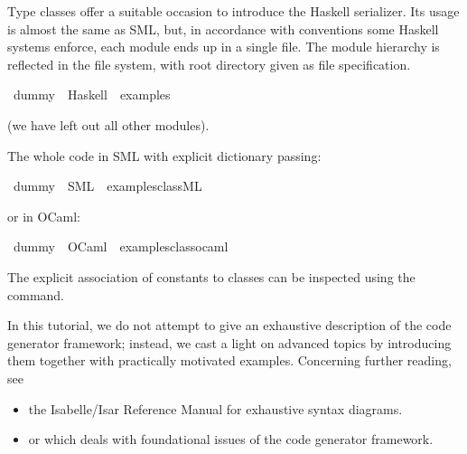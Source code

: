 \begin{isabellebody}
\begin{isamarkuptext}
Type classes offer a suitable occasion to introduce
  the Haskell serializer.  Its usage is almost the same
  as SML, but, in accordance with conventions
  some Haskell systems enforce, each module ends
  up in a single file. The module hierarchy is reflected in
  the file system, with root directory given as file specification.%
\end{isamarkuptext}%
\isamarkuptrue%
\isamarkupfalse%
\ dummy\ \ Haskell\ \ {\isachardoublequoteopen}examples{\isacharslash}{\isachardoublequoteclose}%
\begin{isamarkuptext}%
  \noindent (we have left out all other modules).

  \medskip

  The whole code in SML with explicit dictionary passing:%
\end{isamarkuptext}%
\isamarkuptrue%
\isamarkupfalse%
\ dummy\ \ SML\ \ {\isachardoublequoteopen}examples{\isacharslash}class{\isachardot}ML{\isachardoublequoteclose}%
\begin{isamarkuptext}%

  \medskip

  \noindent or in OCaml:%
\end{isamarkuptext}%
\isamarkuptrue%
\isamarkupfalse%
\ dummy\ \ OCaml\ \ {\isachardoublequoteopen}examples{\isacharslash}class{\isachardot}ocaml{\isachardoublequoteclose}%
\begin{isamarkuptext}%

  \medskip The explicit association of constants
  to classes can be inspected using the \isa{{\isasymPRINTCLASSES}}
  command.%
\end{isamarkuptext}%
\isamarkuptrue%
%
\isamarkuptrue%
%
\begin{isamarkuptext}%
In this tutorial, we do not attempt to give an exhaustive
  description of the code generator framework; instead,
  we cast a light on advanced topics by introducing
  them together with practically motivated examples.  Concerning
  further reading, see

  \begin{itemize}

  \item the Isabelle/Isar Reference Manual \cite{isabelle-isar-ref}
    for exhaustive syntax diagrams.
  \item or \cite{Haftmann-Nipkow:2007:codegen} which deals with foundational issues
    of the code generator framework.


\end{itemize}
\end{isamarkuptext}
\end{isabellebody}
